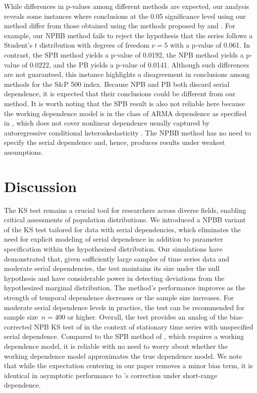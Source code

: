 \documentclass[12pt]{article}
\begin{document}
While differences in p-values among different methods are expected, our analysis
reveals some instances where conclusions at the 0.05 significance level
using our method differ from those obtained using the methods proposed by
\citet{babu2004goodness} and \citet{zeimbekakis2024misuses}.
For example, our NPBB method fails to reject the
hypothesis that the series follows a Student's $t$ distribution with degrees of
freedom $\nu = 5$ with a p-value of 0.061. In contrast,
the SPB method yields a p-value of 0.0192,
the NPB method yields a p-value of 0.0222, and the PB yields a p-value of
0.0141. Although such differences are not guaranteed, this
instance highlights a disagreement in conclusions among methods for the S\&P 500
index. Because NPB and PB both discard serial dependence, it is expected that
their conclusions could be different from our method. It is worth noting that
the SPB result is also not reliable here because the working dependence model is
in the class of ARMA dependence as specified in \citet{zeimbekakis2024misuses},
which does not cover nonlinear dependence usually captured by autoregressive
conditional heteroskedasticity \citep{engle1995arch}. The NPBB method has
no need to specify the serial dependence and, hence, produces results under
weakest assumptions.

\section{Discussion}\label{sec:conclusion}

The KS test remains a crucial tool for researchers across diverse fields,
enabling critical assessments of population distributions. We introduced a
NPBB variant of the KS test tailored for data with
serial dependencies, which eliminates the need for explicit modeling of serial
dependence in addition to parameter specification within the hypothesized
distribution. Our simulations have demonstrated that, given
sufficiently large samples of time series data and moderate serial dependencies,
the test maintains its size under the null hypothesis and have considerable
power in detecting deviations from the hypothesized marginal distribution. The
method's performance improves as the strength of temporal dependence decreases
or the sample size increases. For moderate serial dependence levels in practice,
the test can be recommended for sample size~$n = 400$ or higher.
Overall, the test provides an analog of the bias-corrected NPB KS test of
\citet{babu2004goodness} in the context of stationary time
series with unspecified serial dependence. Compared to the SPB method
of \citet{zeimbekakis2024misuses}, which requires a working dependence model, it
is reliable with no need to worry about whether the working dependence
model approximates the true dependence model. We note that while the
expectation centering in our paper removes a minor bias term, it is identical
in asymptotic performance to \citet{babu2004goodness}'s correction under 
short-range dependence. 
\end{document}
